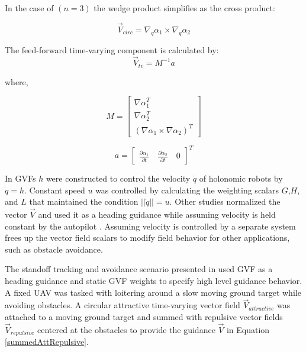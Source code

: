 \documentclass[numbered,pdftex]{ohio-etd}
\begin{document}
\noindent
In the case of $(n=3)$ the wedge product simplifies as the cross product:

\begin{equation}
\overrightarrow{V}_{circ} =  \nabla_q\alpha_1 \times \nabla_q\alpha_2 
\label{circOnlySimp}
\end{equation}

\noindent
The feed-forward time-varying component is calculated by:
\begin{equation}
\label{tv}
\overrightarrow{V}_{tv} = M^{-1}a
\end{equation}

\noindent
where,

\begin{equation}
\label{mMatrix}
M =\begin{bmatrix}
\nabla\alpha_1^T \\
\nabla\alpha_2^T \\
(\nabla\alpha_1 \times \nabla\alpha_2)^T
\end{bmatrix}
\end{equation}

\begin{equation}
\label{aVector}
a =\begin{bmatrix}
\frac{\partial \alpha_1}{\partial t} \quad   \frac{\partial \alpha_2}{\partial t} \quad   0
\end{bmatrix}^T
\end{equation}


In \cite{goncalves_artificial_2009,goncalves_circulation_2010,goncalves_vector_2010} GVFs $h$ were constructed to control the velocity $\dot{q}$ of holonomic robots by $\dot{q}=h$. Constant speed  $u$ was controlled by calculating the weighting scalars $G$,$H$, and $L$ that maintained the condition $||\dot{q}|| = u$. Other studies normalized the vector $\overrightarrow{V}$ and used it as a heading guidance while assuming velocity is held constant by the autopilot \cite{gerlach_autonomous_2014,wwc}. Assuming velocity is controlled by a separate system frees up the vector field scalars to modify field behavior for other applications, such as obstacle avoidance. 
 
 
 The standoff tracking and avoidance scenario presented in \cite{wwc} used GVF as a heading guidance and static GVF weights to specify high level guidance behavior. A fixed UAV was tasked with loitering around a slow moving ground target while avoiding obstacles. A circular attractive time-varying vector field $\overrightarrow{V}_{attractive}$ was attached to a moving ground target and summed with repulsive vector fields $\overrightarrow{V}_{repulsive}$ centered at the obstacles to provide the guidance $\overrightarrow{V}$ in Equation \ref{summedAttRepulsive}. 
 
\end{document}
